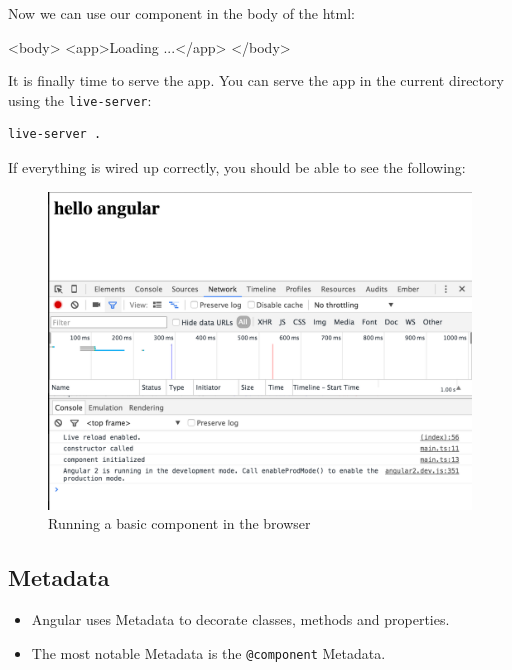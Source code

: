 \documentclass[12pt,]{article}
\newenvironment{Shaded}{}{}
\newcommand{\KeywordTok}[1]{\textcolor[rgb]{0.00,0.00,1.00}{{#1}}}
\newcommand{\NormalTok}[1]{{#1}}
\providecommand{\tightlist}{%
  \setlength{\itemsep}{0pt}\setlength{\parskip}{0pt}}
\begin{document}
Now we can use our component in the body of the html:

\begin{Shaded}
\begin{Highlighting}[numbers=left,,]
\KeywordTok{<body>}
  \KeywordTok{<app>}\NormalTok{Loading ...}\KeywordTok{</app>}
\KeywordTok{</body>}
\end{Highlighting}
\end{Shaded}

It is finally time to serve the app. You can serve the app in the
current directory using the \texttt{live-server}:

\begin{verbatim}
live-server .
\end{verbatim}

If everything is wired up correctly, you should be able to see the
following:

\begin{figure}[htbp]
\centering
\includegraphics{images/hello-angular.png}
\caption{Running a basic component in the browser}
\end{figure}

\subsection{Metadata}\label{metadata}

\begin{itemize}
\tightlist
\item
  Angular uses Metadata to decorate classes, methods and properties.
\item
  The most notable Metadata is the \texttt{@component} Metadata.
\end{itemize}
\end{document}
